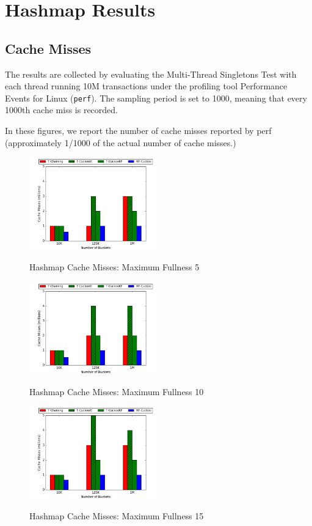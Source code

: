 \chapter{Hashmap Results}
\label{app:hashmaps}

\section{Cache Misses}
\label{app:hashmaps_cm}

The results are collected by evaluating the Multi-Thread Singletons Test with each thread running 10M transactions under the profiling tool Performance Events for Linux (\texttt{perf}). The sampling period is set to 1000, meaning that every 1000th cache miss is recorded.

In these figures, we report the number of cache misses reported by perf (approximately 1/1000 of the actual number of cache misses.)

    \begin{figure}[H]
    \centering
        {\includegraphics[width=0.5\textwidth]{maps/5cm.png}}
        \caption{Hashmap Cache Misses: Maximum Fullness 5}
    \end{figure}

    \begin{figure}[H]
    \centering
        {\includegraphics[width=0.5\textwidth]{maps/10cm.png}}
        \caption{Hashmap Cache Misses: Maximum Fullness 10}
    \end{figure}

    \begin{figure}[H]
    \centering
        {\includegraphics[width=0.5\textwidth]{maps/15cm.png}}
        \caption{Hashmap Cache Misses: Maximum Fullness 15}
    \end{figure}


